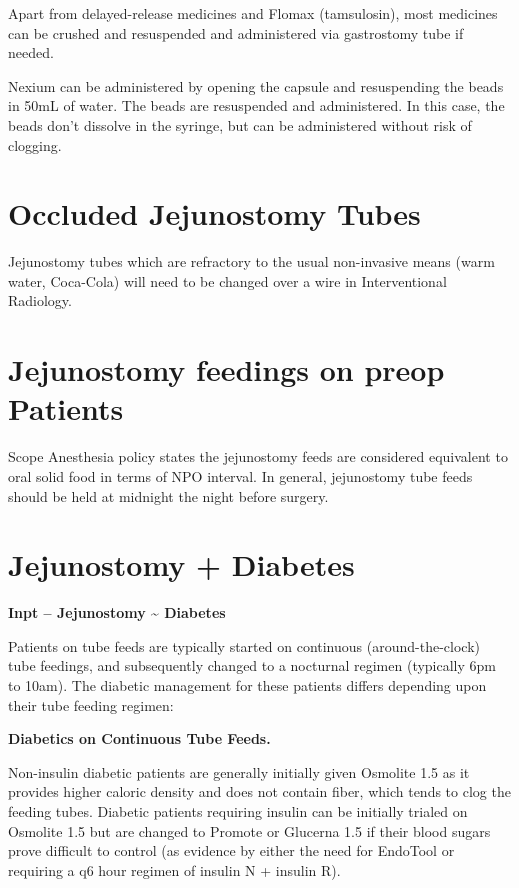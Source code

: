 \documentclass[
]{book}
\begin{document}
Apart from delayed-release medicines and Flomax (tamsulosin), most medicines can be crushed and resuspended and administered via gastrostomy tube if needed.

Nexium can be administered by opening the capsule and resuspending the beads in 50mL of water. The beads are resuspended and administered. In this case, the beads don't dissolve in the syringe, but can be administered without risk of clogging.

\hypertarget{occluded-jejunostomy-tubes}{%
\section{Occluded Jejunostomy Tubes}\label{occluded-jejunostomy-tubes}}

Jejunostomy tubes which are refractory to the usual non-invasive means (warm water, Coca-Cola) will need to be changed over a wire in Interventional Radiology.

\hypertarget{jejunostomy-feedings-on-preop-patients}{%
\section{Jejunostomy feedings on preop Patients}\label{jejunostomy-feedings-on-preop-patients}}

Scope Anesthesia policy states the jejunostomy feeds are considered equivalent to oral solid food in terms of NPO interval. In general, jejunostomy tube feeds should be held at midnight the night before surgery.

\hypertarget{jejunostomy_diabetes}{%
\section{Jejunostomy + Diabetes}\label{jejunostomy_diabetes}}

\textbf{Inpt -- Jejunostomy \textasciitilde{} Diabetes}

Patients on tube feeds are typically started on continuous (around-the-clock) tube feedings, and subsequently changed to a nocturnal regimen (typically 6pm to 10am). The diabetic management for these patients differs depending upon their tube feeding regimen:

\textbf{Diabetics on Continuous Tube Feeds.}

Non-insulin diabetic patients are generally initially given Osmolite 1.5 as it provides higher caloric density and does not contain fiber, which tends to clog the feeding tubes. Diabetic patients requiring insulin can be initially trialed on Osmolite 1.5 but are changed to Promote or Glucerna 1.5 if their blood sugars prove difficult to control (as evidence by either the need for EndoTool or requiring a q6 hour regimen of insulin N + insulin R).
\end{document}
